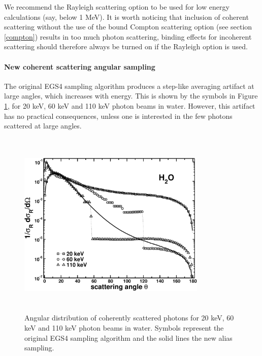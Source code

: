We recommend the Rayleigh
scattering option to be used for low energy calculations
(say, below 1 MeV). It is worth noticing that
inclusion of coherent scattering without the use
of the bound Compton scattering option (see section \ref{compton})
results in too much photon scattering, binding effects
for incoherent scattering should therefore always be turned
on if the Rayleigh option is used.

\paragraph{New coherent scattering angular sampling}\hfill
\label{new_rayleigh_sampling}

The original EGS4 sampling algorithm produces a step-like averaging
artifact at large angles, which increases with energy. This is
shown by the symbols in Figure \ref{ray_ang_sampling_fig}, for
20 keV, 60 keV and 110 keV photon beams in water.
However, this artifact has no practical consequences, unless one is
interested in the few photons scattered at large angles.
\begin{figure}[h]
\includegraphics[height=9cm,width=9cm]{figures/ray_ang_dist_old_vs_new}
\caption[Angular distribution of coherently scattered photons for 20 keV, 60 keV
and 110 keV photon beams in water.]{\label{ray_ang_sampling_fig}
Angular distribution of coherently scattered photons for 20 keV, 60 keV
and 110 keV photon beams in water. Symbols represent the original EGS4
sampling algorithm and the solid lines the new alias sampling.
}
\end{figure}

